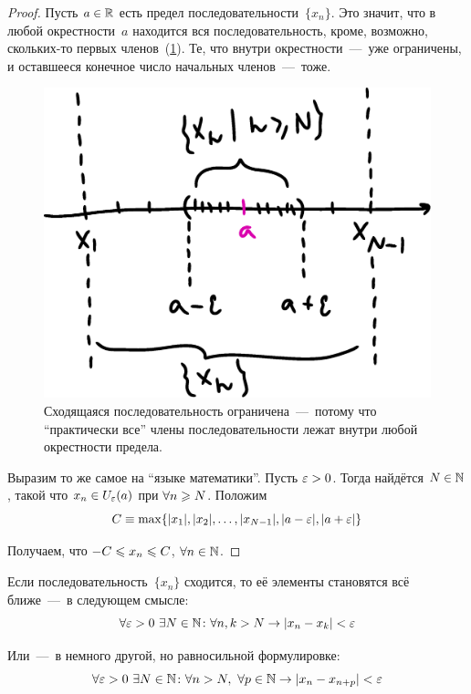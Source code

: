 \documentclass[a4paper,12pt]{article}
\begin{document}
  \begin{proof}
    Пусть $a \hm\in \RR$ есть предел последовательности~$\{x_n\}$.
    Это значит, что в любой окрестности~$a$ находится вся последовательность, кроме, возможно, скольких-то первых членов~(\ref{fig:all-in-a-eps}).
    Те, что внутри окрестности~---~уже ограничены, и оставшееся конечное число начальных членов~---~тоже.
    
    \begin{figure}[ht]
      \centering
      \includegraphics[width=0.6\linewidth]{images/all-in-a-eps}
      
      \caption{
        Сходящаяся последовательность ограничена~---~потому что ``практически все'' члены последовательности лежат внутри любой окрестности предела.
      }
      \label{fig:all-in-a-eps}
    \end{figure}
    
    Выразим то же самое на ``языке математики''.
    Пусть $\eps \hm> 0$.
    Тогда найдётся $N \hm\in \NN$, такой что $x_n \hm\in U_{\eps}(a)$ при $\forall n \hm\geq N$.
    Положим
    \[
      C \equiv \max\{|x_1|, |x_2|, \ldots, |x_{N - 1}|, |a - \varepsilon|, |a + \varepsilon|\}
    \]
    
    Получаем, что ${-}C \hm\leq x_n \hm\leq C$, $\forall n \in \mathbb N$.
  \end{proof}

  \begin{proposition}
    Если последовательность~$\{x_n\}$ сходится, то её элементы становятся всё ближе~---~в следующем смысле:
    \[
      \forall \varepsilon > 0\ \exists N \in \mathbb N\colon \forall n, k > N \to |x_n - x_k| < \varepsilon
    \]
    
    Или~---~в немного другой, но равносильной формулировке:
    \[
      \forall \varepsilon > 0\ \exists N \in \mathbb N\colon \forall n > N,\ \forall p \in \mathbb N \to |x_n - x_{n + p}| < \varepsilon
    \]
  \end{proposition}
  
\end{document}
